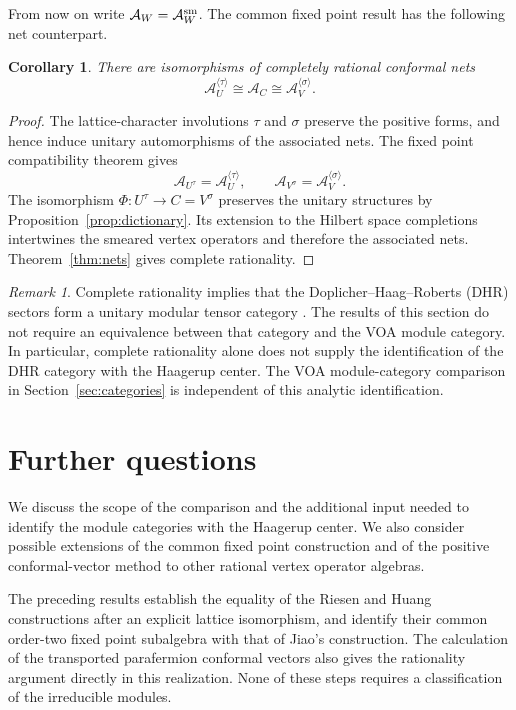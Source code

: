 \documentclass[11pt,reqno]{amsart}
\newtheorem{corollary}[theorem]{Corollary}
\theoremstyle{definition}\newtheorem{definition}[theorem]{Definition}
\theoremstyle{remark}\newtheorem{remark}[theorem]{Remark}
\numberwithin{equation}{section}
\begin{document}
From now on write $\mathcal A_W=\mathcal A_W^{\rm sm}$. The common fixed point result has the following net counterpart.

\begin{corollary}\label{cor:netfixed}
There are isomorphisms of completely rational conformal nets
\[
 \mathcal A_U^{\langle\tau\rangle}\cong\mathcal A_C
       \cong\mathcal A_V^{\langle\sigma\rangle}.
\]
\end{corollary}
\begin{proof}
The lattice-character involutions $\tau$ and $\sigma$ preserve the positive forms, and hence induce unitary automorphisms of the associated nets. The fixed point compatibility theorem \cite[Proposition 7.6]{CKLW} gives
\[
 \mathcal A_{U^\tau}=\mathcal A_U^{\langle\tau\rangle},\qquad
 \mathcal A_{V^\sigma}=\mathcal A_V^{\langle\sigma\rangle}.
\]
The isomorphism $\Phi:U^\tau\longrightarrow C=V^\sigma$ preserves the unitary structures by Proposition~\ref{prop:dictionary}. Its extension to the Hilbert space completions intertwines the smeared vertex operators and therefore the associated nets. Theorem~\ref{thm:nets} gives complete rationality.
\end{proof}

\begin{remark}
Complete rationality implies that the Doplicher--Haag--Roberts (DHR) sectors form a unitary modular tensor category \cite{KLM}. The results of this section do not require an equivalence between that category and the VOA module category. In particular, complete rationality alone does not supply the identification of the DHR category with the Haagerup center. The VOA module-category comparison in Section~\ref{sec:categories} is independent of this analytic identification.
\end{remark}

\section{Further questions}\label{sec:remaining}
We discuss the scope of the comparison and the additional input needed to identify the module categories with the Haagerup center. We also consider possible extensions of the common fixed point construction and of the positive conformal-vector method to other rational vertex operator algebras.

The preceding results establish the equality of the Riesen and Huang constructions after an explicit lattice isomorphism, and identify their common order-two fixed point subalgebra with that of Jiao's construction. The calculation of the transported parafermion conformal vectors also gives the rationality argument directly in this realization. None of these steps requires a classification of the irreducible modules.
\end{document}
